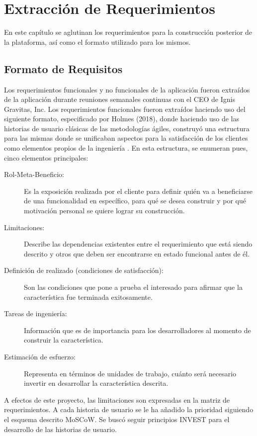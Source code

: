 \chapter{Extracción de Requerimientos}

En este capítulo se aglutinan los requerimientos para la construcción posterior de la plataforma, así como el formato utilizado para los mismos.

\section{Formato de Requisitos}

Los requerimientos funcionales y no funcionales de la aplicación fueron extraídos de la aplicación durante reuniones semanales continuas con el CEO de Ignis Gravitas, Inc. Los requerimientos funcionales fueron extraídos haciendo uso del siguiente formato, especificado por Holmes (2018), donde haciendo uso de las historias de usuario clásicas de las metodologías ágiles, construyó una estructura para las mismas donde se unificaban aspectos para la satisfacción de los clientes como elementos propios de la ingeniería \cite{edx}. En esta estructura, se enumeran pues, cinco elementos principales:


\begin{description}
    \item[Rol-Meta-Beneficio:] Es la exposición realizada por el cliente para definir quién va a beneficiarse de una funcionalidad en específico, para qué se desea construir y por qué motivación personal se quiere lograr su construcción.
    \item[Limitaciones:] Describe las dependencias existentes entre el requerimiento que está siendo descrito y otros que deben ser encontrarse en estado funcional antes de él.
    \item[Definición de realizado (condiciones de satisfacción):] Son las condiciones que pone a prueba el interesado para afirmar que la característica fue terminada exitosamente.
    \item[Tareas de ingeniería:] Información que es de importancia para los desarrolladores al momento de construir la característica.
    \item[Estimación de esfuerzo:] Representa en términos de unidades de trabajo, cuánto será necesario invertir en desarrollar la característica descrita.
\end{description}

A efectos de este proyecto, las limitaciones son expresadas en la matriz de requerimientos. A cada historia de usuario se le ha añadido la prioridad siguiendo el esquema descrito MoSCoW. Se buscó seguir principios INVEST para el desarrollo de las historias de usuario.

